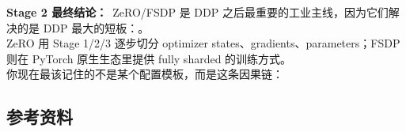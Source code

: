 \begin{summarybox}
\textbf{Stage 2 最终结论：}\
ZeRO/FSDP 是 DDP 之后最重要的工业主线，因为它们解决的是 DDP 最大的短板：。\\
ZeRO 用 Stage 1/2/3 逐步切分 optimizer states、gradients、parameters；FSDP 则在 PyTorch 原生生态里提供 fully sharded 的训练方式。\\
你现在最该记住的不是某个配置模板，而是这条因果链：
\end{summarybox}

\subsection{参考资料}

